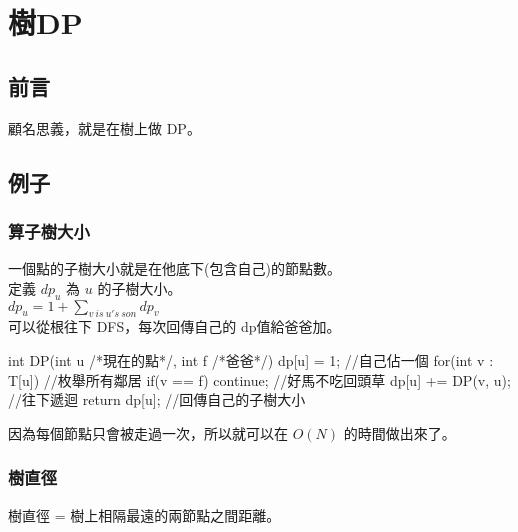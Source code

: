 \chapter{樹DP}
    \section{前言}
    顧名思義，就是在樹上做 DP。
    \section{例子}
        \subsection{算子樹大小}
        一個點的子樹大小就是在他底下(包含自己)的節點數。\\
        定義 $dp_u$ 為 $u$ 的子樹大小。\\
        $dp_u = 1 + \sum\limits_{v\ is \ u's\ son}{dp_v}$ \\
        可以從根往下 DFS，每次回傳自己的 dp值給爸爸加。\\
        \begin{C++}
        int DP(int u /*現在的點*/, int f /*爸爸*/){
            dp[u] = 1; //自己佔一個
            for(int v : T[u]){ //枚舉所有鄰居
                if(v == f) continue; //好馬不吃回頭草
                dp[u] += DP(v, u); //往下遞迴
            }
            return dp[u]; //回傳自己的子樹大小
        }
        \end{C++}
        因為每個節點只會被走過一次，所以就可以在 $O(N)$ 的時間做出來了。
        \subsection{樹直徑}
        樹直徑 = 樹上相隔最遠的兩節點之間距離。
